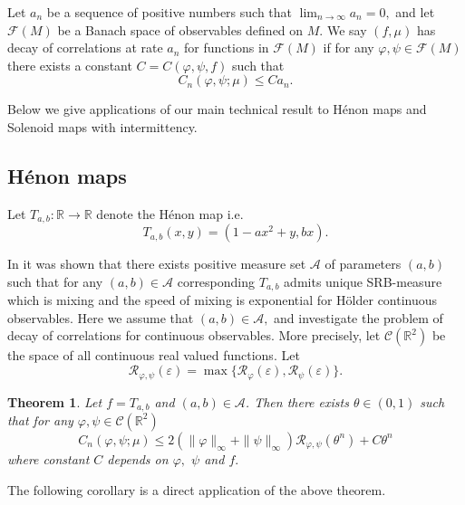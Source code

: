 \documentclass[a4paper,12pt]{amsart}
\numberwithin{equation}{section}
\newtheorem{theorem}{Theorem}[section]\newtheorem{lemma}[theorem]{Lemma}
\begin{document}
 Let $a_n$ be a sequence of
positive numbers such that $\lim_{n \to\infty}a_n=0,$ and let
$\mathcal F(M)$ be a Banach space of observables defined on $M.$ We
say $(f, \mu)$ has decay of correlations at rate $a_n$ for functions
in $\mathcal F(M)$ if for any $\varphi, \psi\in \mathcal F(M)$ there
exists a constant $C=C(\varphi, \psi, f)$ such that
$$C_n(\varphi, \psi; \mu)\le Ca_n.$$

Below we give  applications of our main technical result to H\'enon
maps and Solenoid maps with intermittency.

\subsection{H\'enon maps}
Let $T_{a, b}:\mathbb{R}\to \mathbb{R}$ denote  the H\'enon map i.e.
$$T_{a, b}(x, y)=(1-ax^2+y, bx).$$

In \cite{BC, BY1, BY2} it was shown that there exists positive
measure set  $\mathcal A$ of parameters $(a, b)$ such that for any
$(a, b)\in\mathcal A$ corresponding $T_{a, b}$ admits unique
SRB-measure which is mixing and the speed of mixing is exponential
for H\"older continuous observables.  Here we assume that $(a,
b)\in\mathcal A,$ and investigate the problem of decay of
correlations for continuous observables.  More precisely, let
$\mathcal C(\mathbb R^2)$ be the space of all continuous real valued
functions. Let
$$\mathcal R_{\varphi, \psi}(\varepsilon)=\max\{\mathcal
R_\varphi(\varepsilon), \mathcal R_\psi(\varepsilon)\}.$$

\begin{theorem}\label{main} Let $f=T_{a,b}$ and $(a, b)\in\mathcal A$.
 Then there exists $\theta\in(0, 1)$ such that  for any
$\varphi,\psi \in \mathcal C(\mathbb R^2)$
 \begin{equation} \label{bound} C_n(\varphi, \psi;
\mu)\le 2(\|\varphi\|_\infty+\|\psi\|_\infty)\mathcal R_{\varphi,
\psi}(\theta^n)+C{\theta}^n
 \end{equation}
where constant $C$ depends on $\varphi,$ $\psi$ and $f.$
\end{theorem}

The following corollary is a direct application of the above theorem.
\end{document}
